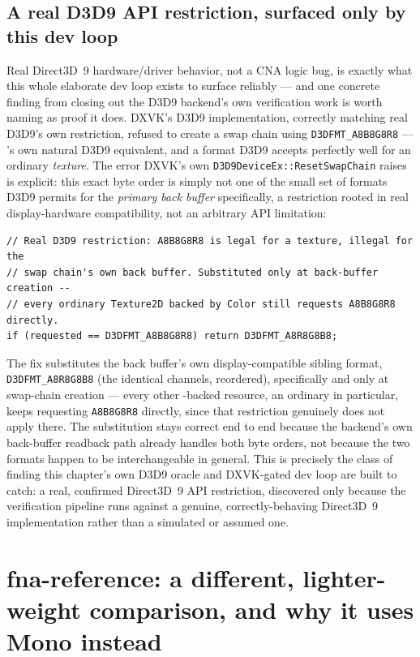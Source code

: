 \subsection{A real D3D9 API restriction, surfaced only by this dev loop}

Real Direct3D~9 hardware/driver behavior, not a CNA logic bug, is exactly what this whole
elaborate dev loop exists to surface reliably --- and one concrete finding from closing out the
D3D9 backend's own verification work is worth naming as proof it does. DXVK's D3D9
implementation, correctly matching real D3D9's own restriction, refused to create a swap chain
using \texttt{D3DFMT\_A8B8G8R8} --- 's own natural D3D9
equivalent, and a format D3D9 accepts perfectly well for an ordinary \emph{texture}. The error
DXVK's own \texttt{D3D9DeviceEx::ResetSwapChain} raises is explicit: this exact byte order is
simply not one of the small set of formats D3D9 permits for the \emph{primary back buffer}
specifically, a restriction rooted in real display-hardware compatibility, not an arbitrary API
limitation:

\begin{lstlisting}
// Real D3D9 restriction: A8B8G8R8 is legal for a texture, illegal for the
// swap chain's own back buffer. Substituted only at back-buffer creation --
// every ordinary Texture2D backed by Color still requests A8B8G8R8 directly.
if (requested == D3DFMT_A8B8G8R8) return D3DFMT_A8R8G8B8;
\end{lstlisting}

The fix substitutes the back buffer's own display-compatible sibling format,
\texttt{D3DFMT\_A8R8G8B8} (the identical channels, reordered), specifically and only at swap-chain
creation --- every other -backed resource, an ordinary
 in particular, keeps requesting \texttt{A8B8G8R8} directly, since that
restriction genuinely does not apply there. The substitution stays correct end to end because
the backend's own back-buffer readback path already handles both byte orders, not because the
two formats happen to be interchangeable in general. This is precisely the class of finding
this chapter's own D3D9 oracle and DXVK-gated dev loop are built to catch: a real, confirmed
Direct3D~9 API restriction, discovered only because the verification pipeline runs against a
genuine, correctly-behaving Direct3D~9 implementation rather than a simulated or assumed one.

\section{fna-reference: a different, lighter-weight comparison, and why it uses Mono instead}

